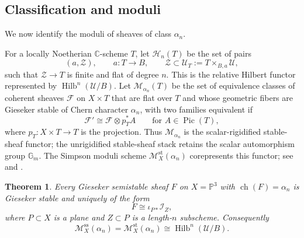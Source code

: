 \documentclass[12pt]{amsart}
\numberwithin{equation}{section}
\newcommand{\PP}{\mathbb{P}}
\newcommand{\C}{\mathbb{C}}
\newcommand{\I}{\mathcal{I}}
\newcommand{\M}{\mathcal{M}}
\newcommand{\Hilb}{\operatorname{Hilb}}
\newcommand{\ch}{\operatorname{ch}}
\newcommand{\Pic}{\operatorname{Pic}}
\theoremstyle{plain}
\newtheorem{theorem}{Theorem}[section]
\theoremstyle{definition}
\theoremstyle{remark}
\begin{document}
\subsection{Classification and moduli}
We now identify the moduli of sheaves of class $\alpha_n$.

For a locally Noetherian $\C$-scheme $T$, let $\mathscr H_n(T)$ be the set of pairs
\[
(a,\mathcal Z),\qquad
a\colon T\to B,
\qquad
\mathcal Z\subset \mathcal U_T:=T\times_{B,a}\mathcal U,
\]
such that $\mathcal Z\to T$ is finite and flat of degree $n$.
This is the relative Hilbert functor represented by $\Hilb^n(\mathcal U/B)$.
Let $\mathscr M_{\alpha_n}(T)$ be the set of equivalence classes of coherent sheaves $\mathcal F$ on $X\times T$ that are flat over $T$ and whose geometric fibers are Gieseker stable of Chern character $\alpha_n$, with two families equivalent if
\[
\mathcal F'\cong \mathcal F\otimes p_T^*A
\qquad\text{for }A\in\Pic(T),
\]
where $p_T\colon X\times T\to T$ is the projection.
Thus $\mathscr M_{\alpha_n}$ is the scalar-rigidified stable-sheaf functor; the unrigidified stable-sheaf stack retains the scalar automorphism group $\mathbb G_m$.
The Simpson moduli scheme $\M_X^{\mathrm{st}}(\alpha_n)$ corepresents this functor; see \cite[Theorem~1.21]{Simpson} and \cite[Section~3]{Thomas}.

\begin{theorem}\label{thm:classification}
Every Gieseker semistable sheaf $F$ on $X=\PP^3$ with $\ch(F)=\alpha_n$ is Gieseker stable and uniquely of the form
\[
F\cong \iota_{P*}\I_Z,
\]
where $P\subset X$ is a plane and $Z\subset P$ is a length-$n$ subscheme.
Consequently
\[
\M_X^{\mathrm{ss}}(\alpha_n)=\M_X^{\mathrm{st}}(\alpha_n)\cong \Hilb^n(\mathcal U/B).
\]
\end{theorem}
\end{document}
